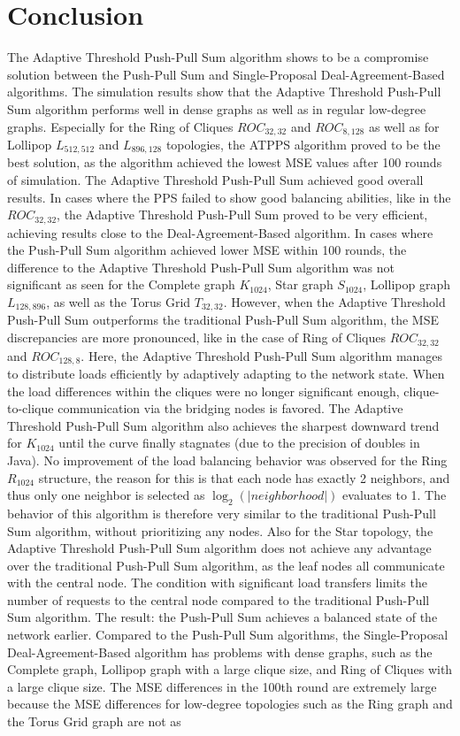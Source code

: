 \chapter{Conclusion}\label{chap:conclusion}
The Adaptive Threshold Push-Pull Sum algorithm shows to be a compromise solution between the Push-Pull Sum and Single-Proposal Deal-Agreement-Based algorithms. The simulation results show that the Adaptive Threshold Push-Pull Sum algorithm performs well in dense graphs as well as in regular low-degree graphs. Especially for the Ring of Cliques $ROC_{32,32}$ and $ROC_{8,128}$ as well as for Lollipop $L_{512,512}$ and $L_{896,128}$ topologies, the ATPPS algorithm proved to be the best solution, as the algorithm achieved the lowest MSE values after 100 rounds of simulation. The Adaptive Threshold Push-Pull Sum achieved good overall results. In cases where the PPS failed to show good balancing abilities, like in the $ROC_{32,32}$, the Adaptive Threshold Push-Pull Sum proved to be very efficient, achieving results close to the Deal-Agreement-Based algorithm. In cases where the Push-Pull Sum algorithm achieved lower MSE within 100 rounds, the difference to the Adaptive Threshold Push-Pull Sum algorithm was not significant as seen for the Complete graph $K_{1024}$, Star graph $S_{1024}$, Lollipop graph $L_{128,896}$, as well as the Torus Grid $T_{32,32}$. However, when the Adaptive Threshold Push-Pull Sum outperforms the traditional Push-Pull Sum algorithm, the MSE discrepancies are more pronounced, like in the case of Ring of Cliques $ROC_{32,32}$ and $ROC_{128,8}$. Here, the Adaptive Threshold Push-Pull Sum algorithm manages to distribute loads efficiently by adaptively adapting to the network state. When the load differences within the cliques were no longer significant enough, clique-to-clique communication via the bridging nodes is favored. The Adaptive Threshold Push-Pull Sum algorithm also achieves the sharpest downward trend for $K_{1024}$ until the curve finally stagnates (due to the precision of doubles in Java). No improvement of the load balancing behavior was observed for the Ring $R_{1024}$ structure, the reason for this is that each node has exactly 2 neighbors, and thus only one neighbor is selected as $\log_{2}{(|neighborhood|)}$ evaluates to 1. The behavior of this algorithm is therefore very similar to the traditional Push-Pull Sum algorithm, without prioritizing any nodes. Also for the Star topology, the Adaptive Threshold Push-Pull Sum algorithm does not achieve any advantage over the traditional Push-Pull Sum algorithm, as the leaf nodes all communicate with the central node. The condition with significant load transfers limits the number of requests to the central node compared to the traditional Push-Pull Sum algorithm. The result: the Push-Pull Sum achieves a balanced state of the network earlier. Compared to the Push-Pull Sum algorithms, the Single-Proposal Deal-Agreement-Based algorithm has problems with dense graphs, such as the Complete graph, Lollipop graph with a large clique size, and Ring of Cliques with a large clique size. The MSE differences in the 100th round are extremely large because the MSE differences for low-degree topologies such as the Ring graph and the Torus Grid graph are not as 